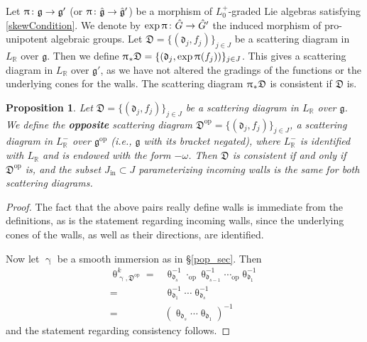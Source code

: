 \documentclass{amsart}
\DeclareMathOperator{\opp}{op}
\DeclareMathOperator{\In}{in}
\let\bb=\mathbb
\let\rar=\rightarrow
\let\f=\mathfrak
\renewcommand{\theta}{\uptheta}
\renewcommand{\gamma}{\upgamma}
\renewcommand{\pi}{\uppi\hspace{0.05em}}
\theoremstyle{plain}%
\newtheorem{prop}[thm]{Proposition}
\theoremstyle{definition}
\theoremstyle{remark}
\begin{document}
Let $\pi\colon \mathfrak{g}\rightarrow \mathfrak{g}'$ (or $\pi\colon \hat{\f{g}}\rar \hat{\f{g}}'$) be a morphism of $L_0^+$-graded Lie algebras satisfying \eqref{skewCondition}.  We denote by $\exp\pi\colon \hat{G}\rightarrow\hat{G}'$ the induced morphism of pro-unipotent algebraic groups.  Let $\f{D}=\{(\f{d}_j,f_j)\}_{j\in J}$ be a scattering diagram in $L_{\mathbb{R}}$ over $\f{g}$.  Then we define $\pi_*\f{D}=\{  (\f{d}_j,\exp\pi(f_j))\}_{j\in J}$.  This gives a scattering diagram in $L_\mathbb{R}$ over $\mathfrak{g}'$, as we have not altered the gradings of the functions or the underlying cones for the walls.  The scattering diagram $\pi_*\f{D}$ is consistent if $\f{D}$ is.

\begin{prop}
Let $\f{D}=\{(\f{d}_j,f_j)\}_{j\in J}$ be a scattering diagram in $L_{\mathbb{R}}$ over $\f{g}$.  We define the \textbf{opposite} scattering diagram $\f{D}^{\opp}=\{(\f{d}_j,f_j)\}_{j\in J}$, a scattering diagram in $L^-_{\mathbb{R}}$ over $\f{g}^{\opp}$ (i.e., $\f{g}$ with its bracket negated), where $L^-_{\bb{R}}$ is identified with $L_{\bb{R}}$ and is endowed with the form $-\omega$.  Then $\f{D}$ is consistent if and only if $\f{D}^{\opp}$ is, and the subset $J_{\In}\subset J$ parameterizing incoming walls is the same for both scattering diagrams.
\end{prop}
\begin{proof}

The fact that the above pairs really define walls is immediate from the definitions, as is the statement regarding incoming walls, since the underlying cones of the walls, as well as their directions, are identified.

Now let $\gamma$ be a smooth immersion as in \S \ref{pop_sec}.  Then 
\begin{align*}
\theta^k_{\gamma,\f{D}^{\opp}}=&\theta^{-1}_{\f{d}_s}\cdot_{\opp}  \theta^{-1}_{\f{d}_{s-1}}\cdots_{\opp} \theta^{-1}_{\f{d}_{1}}\\=&
\theta^{-1}_{\f{d}_{1}}\cdots \theta^{-1}_{\f{d}_s}\\=
&(\theta_{\f{d}_{s}}\cdots \theta_{\f{d}_1})^{-1}
\end{align*}
and the statement regarding consistency follows.
\end{proof}
\end{document}
